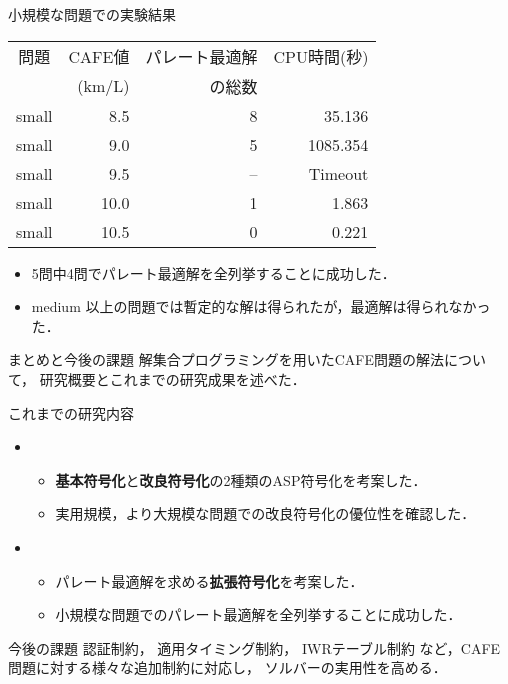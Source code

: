 \documentclass[dvipdfmx, 11pt]{beamer}
\begin{document}
\begin{frame}{小規模な問題での実験結果}
 \begin{exampleblock}{}
  \centering
  \begin{tabular}{c|r|rr}
   問題   & CAFE値  & パレート最適解 & CPU時間(秒) \\
          & (km/L)  & の総数  &  \\ \hline
   small  & 8.5   & 8             & 35.136     \\
   small  & 9.0   & 5             & 1085.354   \\
   small  & 9.5   & --            & Timeout    \\
   small  & 10.0  & 1             & 1.863      \\
   small  & 10.5  & 0             & 0.221      \\ 
  \end{tabular}
 \end{exampleblock}
 \begin{itemize}
  \item 5問中4問でパレート最適解を全列挙することに成功した．
  \item medium 以上の問題では暫定的な解は得られたが，最適解は得られなかった．
 \end{itemize}
\end{frame}
\begin{frame}{まとめと今後の課題}
 解集合プログラミングを用いたCAFE問題の解法について，
 研究概要とこれまでの研究成果を述べた．
 \begin{block}{これまでの研究内容}
  \begin{itemize}
   \item {}
	 \begin{itemize}
	  \item {\bf 基本符号化}と{\bf 改良符号化}の2種類のASP符号化を考案した．
	  \item 実用規模，より大規模な問題での改良符号化の優位性を確認した．
	 \end{itemize}
   \item {}
	 \begin{itemize}
	  \item パレート最適解を求める{\bf 拡張符号化}を考案した．
	  \item 小規模な問題でのパレート最適解を全列挙することに成功した．
	 \end{itemize}
  \end{itemize}
 \end{block}
 \begin{alertblock}{今後の課題}
  認証制約，
  適用タイミング制約，
  IWRテーブル制約
  など，CAFE 問題に対する様々な追加制約に対応し，
  ソルバーの実用性を高める．

 \end{alertblock}
\end{frame}
\end{document}
